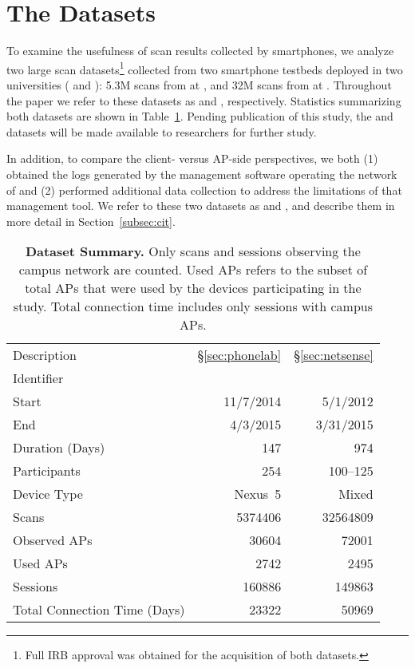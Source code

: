 
\section{The Datasets}
\label{sec:dataset}

To examine the usefulness of \wifi{} scan results collected by smartphones, we
analyze two large scan datasets\footnote{Full IRB approval was obtained for the
acquisition of both datasets.} collected from two smartphone testbeds deployed
in two universities (\ub{} and \nd{}): 5.3M scans from
\PhoneLab{} at \ub{}, and 32M scans from \NetSense{} at \nd{}.
Throughout the paper we refer to these datasets as \textbf{\ubscan{}} and
\textbf{\ndscan{}}, respectively. Statistics summarizing both datasets are
shown in Table~\ref{tab:stats}. Pending publication of this study, the \ubscan{}
and \ndscan{} datasets will be made available to researchers for further study.

In addition, to compare the client- versus AP-side perspectives, we
both (1) obtained the logs generated by the management software
operating the \wifi{} network of \ub{} and (2) performed additional data collection
to address the limitations of that management tool. We refer to these two
datasets as \textbf{\ubap{}} and \textbf{\ubapdetail{}}, and describe them in
more detail in Section~\ref{subsec:cit}.

\begin{table}[t]
  {\small
  \begin{tabularx}{\columnwidth}{Xrr}
    & \PhoneLab{} & \NetSense{}\\\midrule
    Description & \S\ref{sec:phonelab} & \S\ref{sec:netsense} \\
    Identifier & \ubscan{} & \ndscan{} \\ 
    Start & 11/7/2014 & 5/1/2012 \\ 
    End & 4/3/2015 & 3/31/2015 \\ 
    Duration (Days) & 147 & 974 \\ \midrule
    Participants & 254 & 100--125 \\
    Device Type & Nexus~5 & Mixed \\ \midrule
    Scans & \num{5374406} & \num{32564809} \\
    Observed APs & \num{30604} & \num{72001} \\
    Used APs & \num{2742} & \num{2495}\\ \midrule
    \wifi{} Sessions & \num{160886} & \num{149863} \\
    Total Connection Time (Days) & \num{23322} & \num{50969} 
  \end{tabularx}
  \caption{\textbf{Dataset Summary.} Only \wifi{} scans and sessions
  observing the campus network are counted. Used APs refers to the subset of
  total APs that were used by the devices participating in the study. Total
connection time includes only \wifi{} sessions with campus APs.}
  \label{tab:stats}
  \vspace*{-5mm}
}
\end{table}


